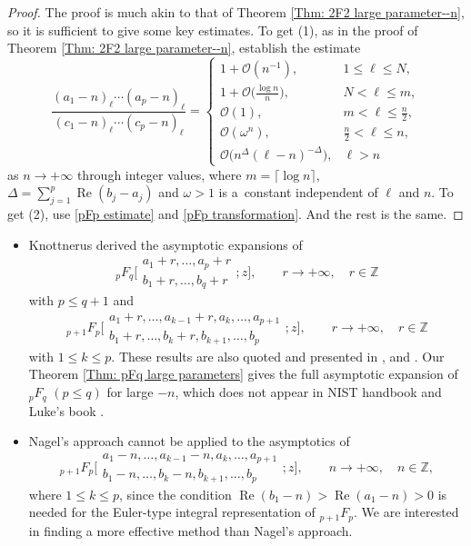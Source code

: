 \documentclass[pdftex]{sigma}
\numberwithin{equation}{section}
\newcommand{\ZZ}{\ensuremath{\mathbb{Z}}}
\newcommand{\mo}{\mathcal{O}}
\begin{document}
\begin{proof}
	The proof is much akin to that of Theorem \ref{Thm: 2F2 large parameter--n}, so it is sufficient to give some key estimates. To get (1), as in the proof of Theorem \ref{Thm: 2F2 large parameter--n}, establish the estimate
		\[\frac{(a_1-n)_\ell\cdots(a_p-n)_\ell}{(c_1-n)_\ell\cdots(c_p-n)_\ell}=\begin{cases}
			1+\mo(n^{-1}),& 1\leqslant\ell\leqslant N,\\
			\displaystyle 1+\mo\bigg(\frac{\log n}{n}\bigg),& N<\ell\leqslant m,\\
			\mo(1),& m<\ell\leqslant\frac{n}{2},\\
			 \mo(\omega^n),& \frac{n}{2}<\ell\leqslant n,\\
			 \mo\big(n^{\Delta}(\ell-n)^{-\Delta}\big),& \ell>n
		\end{cases}\]
		as $n\to +\infty$ through integer values, where $m=\lceil\log n\rceil$, $\Delta=\sum_{j=1}^{p}\operatorname{Re}(b_j-a_j)$ and $\omega>1$ is a~constant independent of $\ell$ and $n$. To get (2), use \eqref{pFp estimate} and \eqref{pFp transformation}. And the rest is the same.
\end{proof}

\begin{Remark}\quad
\quad
\begin{itemize}\itemsep=0pt
		\item[(1)] Knottnerus \cite{Knottnerus-1960} derived the asymptotic expansions of
		\[{}_pF_q\biggl[\begin{matrix}
			a_1+r,\dots,a_p+r\\
			b_1+r,\dots,b_q+r
		\end{matrix};z\biggr],\qquad r\to +\infty,\quad r\in\ZZ\]
		with $p\leqslant q+1$ and
		\[{}_{p+1}F_p\biggl[\begin{matrix}
			a_1+r,\dots,a_{k-1}+r,a_k,\dots,a_{p+1}\\
			b_1+r,\dots,b_k+r,b_{k+1},\dots,b_p
		\end{matrix};z\biggr],\qquad r\to +\infty,\quad r\in\ZZ\]
		with $1\leqslant k\leqslant p$. These results are also quoted and presented in \cite[Section~7.3]{Luke-1969}, \cite[Ap\-pendix~1]{Nagel-2004} and \cite[Section~16.11\,(iii)]{NIST-Handbook}. Our Theorem \ref{Thm: pFq large parameters} gives the full asymptotic expansion of $_pF_q$ $(p\leqslant q)$ for large $-n$, which does not appear in NIST handbook \cite{NIST-Handbook} and Luke's book \cite{Luke-1969}.
		
		\item[(2)] Nagel's approach cannot be applied to the asymptotics of
		\[{}_{p+1}F_p\biggl[\begin{matrix}
			a_1-n,\dots,a_{k-1}-n,a_k,\dots,a_{p+1}\\
			b_1-n,\dots,b_k-n,b_{k+1},\dots,b_p
		\end{matrix};z\biggr],\qquad n\to +\infty,\quad n\in\ZZ,\]
		where $1\leqslant k\leqslant p$, since the condition $\operatorname{Re}(b_1-n)>\operatorname{Re}(a_1-n)>0$ is needed for the Euler-type integral representation of $_{p+1}F_p$. We are interested in finding a more effective method than Nagel's approach.
	\end{itemize}
\end{Remark}
\end{document}
